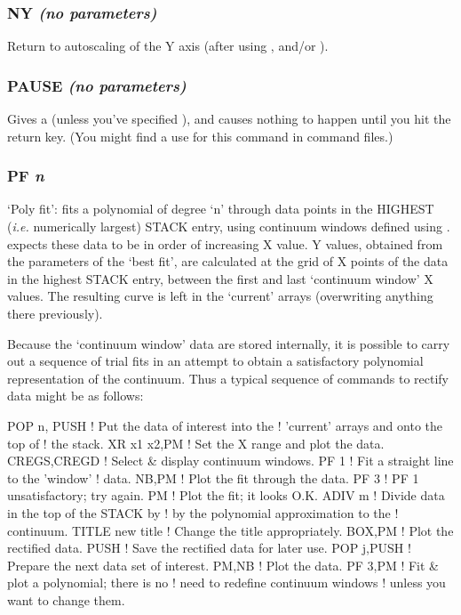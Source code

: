 \documentclass[twoside,11pt,noabs,nolof]{starlink}
\providecommand{\dipcom}[3]{\subsubsection*{\label{COM:#1}\xlabel{COM:#1}\textbf{#1} \emph{#2}}}
\begin{document}
\dipcom{NY}{(no parameters)}{Returns to auto-scaling of the Y axis}
Return to autoscaling of the Y axis (after using ,    and/or ).

\dipcom{PAUSE}{(no parameters)}{Pauses until the <RETURN> key is hit}
Gives a   (unless you've specified ),  and causes nothing to
happen until you hit the return key. (You might find a use for this
command in command files.)

\dipcom{PF}{n}{Fits a polynomial through the data in the windows defined by {\texttt{CREGS}}}
`Poly fit': fits a polynomial of degree `n' through data points in the
HIGHEST (\emph{i.e.} numerically largest) STACK entry, using continuum
windows defined using .    expects these data to be in order of
increasing X value. Y values, obtained from the parameters of the
`best fit', are calculated at the grid of X points of the data in the
highest STACK entry, between the first and last `continuum window' X
values. The resulting curve is left in the `current' arrays
(overwriting anything there previously).

Because the `continuum window' data are stored internally, it is
possible to carry out a sequence of trial fits in an attempt to obtain
a satisfactory polynomial representation of the continuum. Thus a
typical sequence of commands to rectify data might be as follows:

\begin{terminalv}
POP n, PUSH       ! Put the  data  of  interest  into  the
                  ! 'current'  arrays and onto the top  of
                  ! the stack.
XR x1 x2,PM       ! Set the X range and plot the data.
CREGS,CREGD       ! Select & display  continuum windows.
PF 1              ! Fit  a  straight line to the  'window'
                  ! data.
NB,PM             ! Plot the fit through the data.
PF 3              ! PF 1 unsatisfactory; try again.
PM                ! Plot the fit; it looks O.K.
ADIV m            ! Divide data in the top of the STACK by
                  ! by the polynomial approximation to the
                  ! continuum.
TITLE new title   ! Change the title appropriately.
BOX,PM            ! Plot the rectified data.
PUSH              ! Save the rectified data for later use.
POP j,PUSH        ! Prepare the next data set of interest.
PM,NB             ! Plot the data.
PF 3,PM           ! Fit & plot a polynomial; there is  no
                  ! need  to  redefine  continuum  windows
                  ! unless you want to change them.
\end{terminalv}
\end{document}
